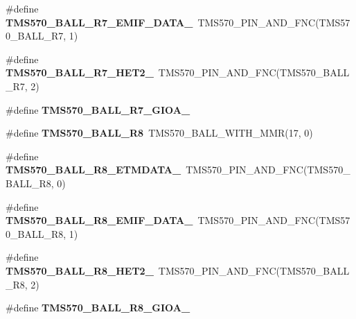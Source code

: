 \begin{DoxyCompactItemize}
\mbox{\label{tms570lc4357-pins_8h_a1208a222d377043f80611c951f17dc9a}} 
\#define {\bfseries T\+M\+S570\+\_\+\+B\+A\+L\+L\+\_\+\+R7\+\_\+\+E\+M\+I\+F\+\_\+\+D\+A\+T\+A\+\_}~T\+M\+S570\+\_\+\+P\+I\+N\+\_\+\+A\+N\+D\+\_\+\+F\+NC(T\+M\+S570\+\_\+\+B\+A\+L\+L\+\_\+\+R7, 1)
\item 
\mbox{\label{tms570lc4357-pins_8h_afe241c4573ef44d76a58814edb9da414}} 
\#define {\bfseries T\+M\+S570\+\_\+\+B\+A\+L\+L\+\_\+\+R7\+\_\+\+H\+E\+T2\+\_}~T\+M\+S570\+\_\+\+P\+I\+N\+\_\+\+A\+N\+D\+\_\+\+F\+NC(T\+M\+S570\+\_\+\+B\+A\+L\+L\+\_\+\+R7, 2)
\item 
\#define {\bfseries T\+M\+S570\+\_\+\+B\+A\+L\+L\+\_\+\+R7\+\_\+\+G\+I\+O\+A\+\_}
\item 
\mbox{\label{tms570lc4357-pins_8h_af89fd36ad39810b845eccab488fe8699}} 
\#define {\bfseries T\+M\+S570\+\_\+\+B\+A\+L\+L\+\_\+\+R8}~T\+M\+S570\+\_\+\+B\+A\+L\+L\+\_\+\+W\+I\+T\+H\+\_\+\+M\+MR(17, 0)
\item 
\mbox{\label{tms570lc4357-pins_8h_a6cf81ddba73737e6b5257129aa238acd}} 
\#define {\bfseries T\+M\+S570\+\_\+\+B\+A\+L\+L\+\_\+\+R8\+\_\+\+E\+T\+M\+D\+A\+T\+A\+\_}~T\+M\+S570\+\_\+\+P\+I\+N\+\_\+\+A\+N\+D\+\_\+\+F\+NC(T\+M\+S570\+\_\+\+B\+A\+L\+L\+\_\+\+R8, 0)
\item 
\mbox{\label{tms570lc4357-pins_8h_a5e50970fe4fe9cb7492eb487532340b7}} 
\#define {\bfseries T\+M\+S570\+\_\+\+B\+A\+L\+L\+\_\+\+R8\+\_\+\+E\+M\+I\+F\+\_\+\+D\+A\+T\+A\+\_}~T\+M\+S570\+\_\+\+P\+I\+N\+\_\+\+A\+N\+D\+\_\+\+F\+NC(T\+M\+S570\+\_\+\+B\+A\+L\+L\+\_\+\+R8, 1)
\item 
\mbox{\label{tms570lc4357-pins_8h_aa53103678b2d4ac797d088125b77b06c}} 
\#define {\bfseries T\+M\+S570\+\_\+\+B\+A\+L\+L\+\_\+\+R8\+\_\+\+H\+E\+T2\+\_}~T\+M\+S570\+\_\+\+P\+I\+N\+\_\+\+A\+N\+D\+\_\+\+F\+NC(T\+M\+S570\+\_\+\+B\+A\+L\+L\+\_\+\+R8, 2)
\item 
\#define {\bfseries T\+M\+S570\+\_\+\+B\+A\+L\+L\+\_\+\+R8\+\_\+\+G\+I\+O\+A\+\_}
\item 
\mbox{\label{tms570lc4357-pins_8h_a3fa67adba184c7376db9796b4915efb8}} 

\end{DoxyCompactItemize}
